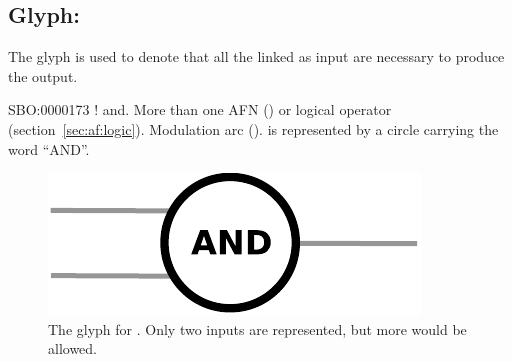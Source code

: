 \subsection{Glyph: }
\label{sec:af:and}

The glyph  is used to denote that all the  linked as input are necessary to produce the output.

\begin{glyphDescription}
 \glyphSboTerm SBO:0000173 ! and.
 \glyphOrigin More than one AFN () or logical operator (section~\ref{sec:af:logic}).
 \glyphTarget  Modulation arc ().
 \glyphNode {} is represented by a circle carrying the word ``AND''.
\end{glyphDescription}

\begin{figure}[H]
  \centering
  \includegraphics[scale = 0.5]{images/and}
  \caption{The \AF glyph for . Only two inputs are represented, but more would be allowed.}
  \label{fig:af:and}
\end{figure}

